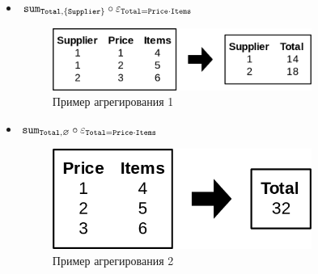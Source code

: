 \begin{itemize}
	\item $\texttt{sum}_{\texttt{Total},\{\texttt{Supplier}\}} \circ
		      \varepsilon_{\texttt{Total}=\texttt{Price} \cdot \texttt{Items}}$
	      \begin{figure}[H]
		      \centering
		      \includegraphics[width=0.8\textwidth]{../assets/kgeorgiy/relalgebra/Data_Aggregate_1_2.svg.png}
		      \caption{Пример агрегирования 1}
		      \label{aggr-ex-1}
	      \end{figure}
	\item $\texttt{sum}_{\texttt{Total},\varnothing} \circ \varepsilon_{\texttt{Total}=\texttt{Price} \cdot \texttt{Items}}$
	      \begin{figure}[H]
		      \centering
		      \includegraphics[width=0.8\textwidth]{../assets/kgeorgiy/relalgebra/Data_Aggregate_2_2.svg.png}
		      \caption{Пример агрегирования 2}
		      \label{aggr-ex-2}
	      \end{figure}
\end{itemize}


